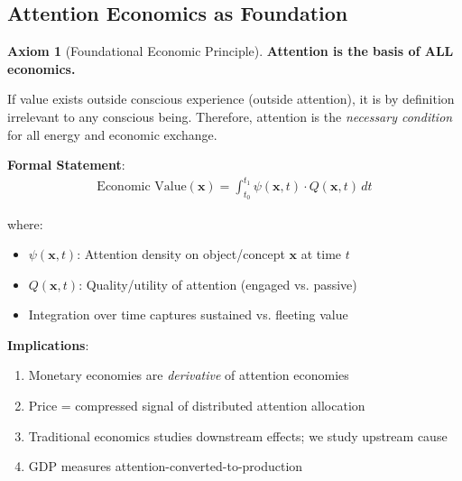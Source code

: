 \documentclass[11pt,a4paper]{article}
\theoremstyle{definition}
\newtheorem{axiom}{Axiom}[section]
\theoremstyle{remark}
\begin{document}
\subsection{Attention Economics as Foundation}

\begin{axiom}[Foundational Economic Principle]
\textbf{Attention is the basis of ALL economics.}

If value exists outside conscious experience (outside attention), it is by definition irrelevant to any conscious being. Therefore, attention is the \textit{necessary condition} for all energy and economic exchange.

\textbf{Formal Statement}:
\begin{align}
\text{Economic Value}(\mathbf{x}) = \int_{t_0}^{t_1} \psi(\mathbf{x}, t) \cdot Q(\mathbf{x}, t) \, dt
\end{align}

where:
\begin{itemize}
    \item \(\psi(\mathbf{x}, t)\): Attention density on object/concept \(\mathbf{x}\) at time \(t\)
    \item \(Q(\mathbf{x}, t)\): Quality/utility of attention (engaged vs. passive)
    \item Integration over time captures sustained vs. fleeting value
\end{itemize}

\textbf{Implications}:
\begin{enumerate}
\item Monetary economies are \textit{derivative} of attention economies
\item Price = compressed signal of distributed attention allocation
\item Traditional economics studies downstream effects; we study upstream cause
\item GDP measures attention-converted-to-production
\end{enumerate}
\end{axiom}
\end{document}
